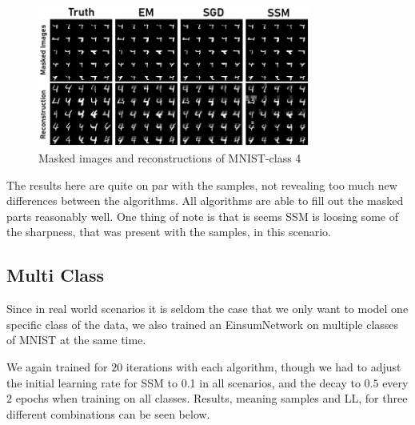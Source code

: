 \begin{figure}[H]
    \centering
    \includegraphics[width=0.8\textwidth]{figures/einsum/mnist/reconstructions_4.png}
    \caption{Masked images and reconstructions of MNIST-class 4}
\end{figure}

The results here are quite on par with the samples, not revealing too much 
new differences between the algorithms. All algorithms are able to fill out 
the masked parts reasonably well. One thing of note is that is seems SSM is
loosing some of the sharpness, that was present with the samples, in this scenario.

\subsection{Multi Class}
\label{sec:exp_mnist_multi}

Since in real world scenarios it is seldom the case that we only want to model one specific 
class of the data, we also trained an EinsumNetwork
on multiple classes of MNIST at the same time.

We again trained for $20$ iterations with each algorithm, though we had to adjust the initial learning rate for SSM 
to 0.1 in all scenarios, and the decay to $0.5$ every \emph{$2$} epochs when training on all classes.
Results, meaning samples and LL, for three different combinations can be seen below. \\

